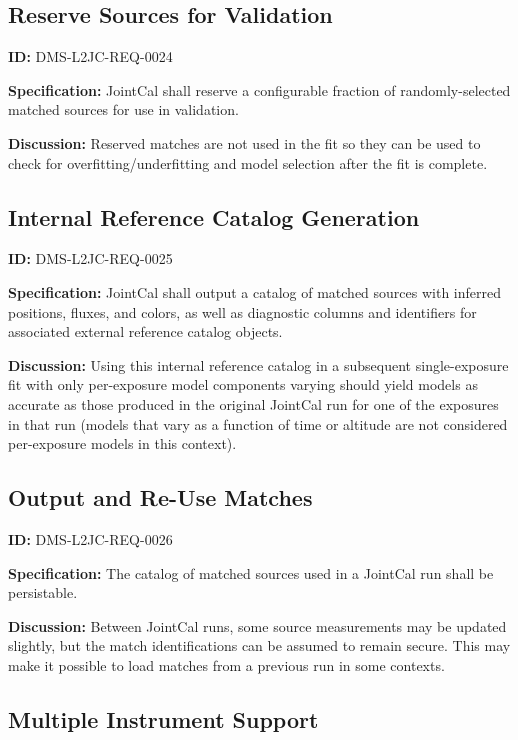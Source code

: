 \documentclass[SE,toc,lsstdraft]{lsstdoc}
\begin{document}
\subsection{Reserve Sources for Validation}

\label{DMS-L2JC-REQ-0024}
\textbf{ID:} DMS-L2JC-REQ-0024

\textbf{Specification:}
JointCal shall reserve a configurable fraction of randomly-selected matched sources for use in validation.

\textbf{Discussion:}
Reserved matches are not used in the fit so they can be used to check for overfitting/underfitting and model selection after the fit is complete.

\subsection{Internal Reference Catalog Generation}

\label{DMS-L2JC-REQ-0025}
\textbf{ID:} DMS-L2JC-REQ-0025

\textbf{Specification:}
JointCal shall output a catalog of matched sources with inferred positions, fluxes, and colors, as well as diagnostic columns and identifiers for associated external reference catalog objects.

\textbf{Discussion:}
Using this internal reference catalog in a subsequent single-exposure fit with only per-exposure model components varying should yield models as accurate as those produced in the original JointCal run for one of the exposures in that run (models that vary as a function of time or altitude are not considered per-exposure models in this context).

\subsection{Output and Re-Use Matches}

\label{DMS-L2JC-REQ-0026}
\textbf{ID:} DMS-L2JC-REQ-0026

\textbf{Specification:}
The catalog of matched sources used in a JointCal run shall be persistable.

\textbf{Discussion:}
Between JointCal runs, some source measurements may be updated slightly, but the match identifications can be assumed to remain secure.  This may make it possible to load matches from a previous run in some contexts.

\subsection{Multiple Instrument Support}
\end{document}
